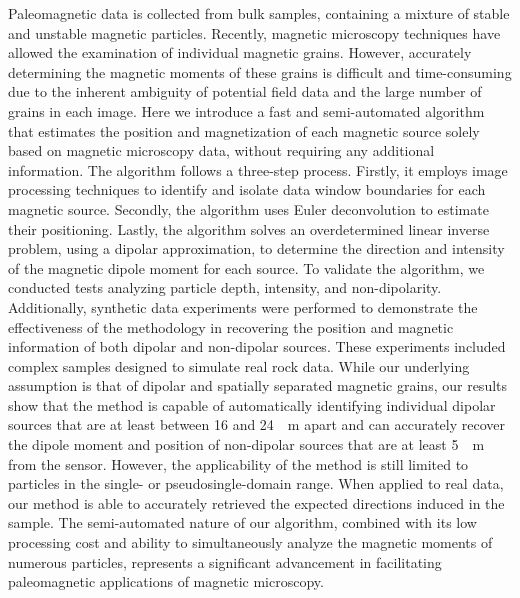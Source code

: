 Paleomagnetic data is collected from bulk samples, containing a mixture of stable and unstable magnetic particles. 
Recently, magnetic microscopy techniques have allowed the examination of individual magnetic grains. 
However, accurately determining the magnetic moments of these grains is difficult and time-consuming due to the inherent ambiguity of potential field data and the large number of grains in each image. 
Here we introduce a fast and semi-automated algorithm that estimates the position and magnetization of each magnetic source solely based on magnetic microscopy data, without requiring any additional information. 
The algorithm follows a three-step process. 
Firstly, it employs image processing techniques to identify and isolate data window boundaries for each magnetic source. 
Secondly, the algorithm uses Euler deconvolution to estimate their positioning. 
Lastly, the algorithm solves an overdetermined linear inverse problem, using a dipolar approximation, to determine the direction and intensity of the magnetic dipole moment for each source. 
To validate the algorithm, we conducted tests analyzing particle depth, intensity, and non-dipolarity. 
Additionally, synthetic data experiments were performed to demonstrate the effectiveness of the methodology in recovering the position and magnetic information of both dipolar and non-dipolar sources. 
These experiments included complex samples designed to simulate real rock data. 
While our underlying assumption is that of dipolar and spatially separated magnetic grains, our results show that the method is capable of automatically identifying individual dipolar sources that are at least between 16 and \qty{24}{\mu\meter} apart and can accurately recover the dipole moment and position of non-dipolar sources that are at least \qty{5}{\mu\meter} from the sensor.
However, the applicability of the method is still limited to particles in the single- or pseudosingle-domain range.
When applied to real data, our method is able to accurately retrieved the expected directions induced in the sample. 
The semi-automated nature of our algorithm, combined with its low processing cost and ability to simultaneously analyze the magnetic moments of numerous particles, represents a significant advancement in facilitating paleomagnetic applications of magnetic microscopy.